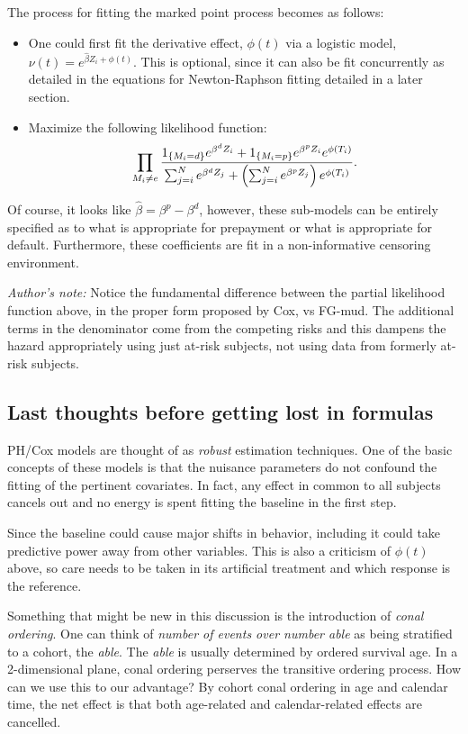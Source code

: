\documentclass[10pt]{article}
\begin{document}
The process for fitting the marked point process becomes as follows:
\begin{itemize}
    \item One could first fit the derivative effect, $\phi(t)$ via a logistic model, $\nu(t)=e^{\hat{\beta}Z_i+\phi(t)}$.  
        This is optional, since it can also be fit concurrently as detailed in the equations for Newton-Raphson fitting detailed in a later
        section.

\item Maximize the following likelihood function:
$$\prod_{M_i \not = e} {{1_{\{M_i=d\}}e^{\beta^d Z_i}+1_{\{M_i=p\}}e^{\beta^p Z_i}e^{\phi(T_i)} }
\over { \sum_{j=i}^N e^{\beta^d Z_j}+\left({\sum_{j=i}^N e^{\beta^p Z_j}}\right)e^{\phi(T_i)} } }. $$
\end{itemize}

Of course, it looks like $\hat{\beta}=\beta^p-\beta^d$, however, these sub-models can be entirely specified as to what is appropriate for prepayment or what is
appropriate for default. Furthermore, these coefficients are fit in a non-informative censoring environment.


{\em Author's note:} Notice the fundamental difference between the partial likelihood function above, in the proper form proposed by Cox, vs
FG-mud.
The additional terms in the denominator come from the competing risks and this dampens the hazard appropriately using just at-risk subjects,
not using data from formerly at-risk subjects.

\subsection{Last thoughts before getting lost in formulas}

PH/Cox models are thought of as {\em robust} estimation techniques.
One of the basic concepts of these models is that the nuisance parameters do not confound the fitting of the pertinent covariates.  
In fact, any effect in common to all subjects cancels out and   
no energy is spent fitting the baseline in the first step.  

Since the baseline could cause major shifts in behavior, including it could take predictive power away from other variables.  
This is also a criticism of $\phi(t)$ above, so care needs to be taken in its artificial treatment and which response is the reference.

Something that might be new in this discussion is the introduction of {\em conal ordering}.
One can think of {\em number of events over number able} as being stratified to a cohort,
the {\em able}.   The {\em able} is usually determined by ordered survival age.  In a 2-dimensional plane, conal ordering perserves the
transitive ordering process.  How can we use this to our advantage?  By cohort conal ordering in age and calendar time,
        the net effect is that both age-related and calendar-related effects are cancelled.  
\end{document}
